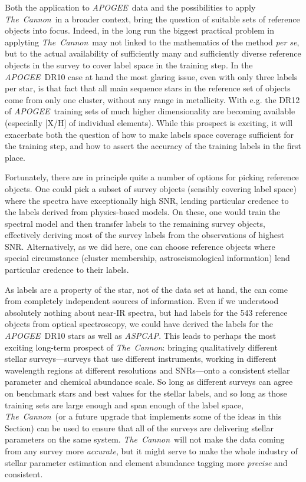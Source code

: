 \documentclass[12pt, preprint]{aastex}
\newcommand{\sectionname}{Section}
\newcommand{\tc}{\textsl{The~Cannon}}
\newcommand{\apogee}{\textsl{APOGEE}}
\newcommand{\aspcap}{\textsl{ASPCAP}}
\begin{document}
Both the application to \apogee\ data and the possibilities to apply \tc\ in a broader context, bring the question of suitable sets of reference objects into focus. Indeed, in the long run the biggest practical problem in applyting \tc\ may not linked to the mathematics of the method \textit{per se}, but to the actual availability of sufficiently many and sufficiently diverse reference objects in the survey to cover label space in the training step. In the \apogee\ DR10 case at hand the most glaring issue, even with only three labels per star, is 
that fact that all main sequence stars in the reference set of objects come from only one cluster, without any range in metallicity. With e.g. the DR12 of \apogee\ training sets of much higher dimensionality are becoming available (especially [X/H] of individual elements). While this prospect is exciting, it will exacerbate both the question of how to make labels space coverage sufficient for the training step, and how to assert the accuracy of the training labels in the first place. 

Fortunately, there are in principle quite a number of options for picking reference objects. One could pick a subset of survey objects (sensibly covering label space) where the spectra have exceptionally high SNR, 
lending particular credence to the labels derived from physics-based models. On these, one would train the spectral model and then transfer labels to the remaining survey objects, effectively deriving most of the survey labels from the observations of highest SNR.
Alternatively, as we did here, one can choose reference objects where special circumstance (cluster membership, astroseismological information) lend particular credence to their labels. 

As labels are a property of the star, not of the data set at hand, the can come from completely independent sources of information. Even if we understood absolutely nothing about near-IR spectra, but had labels for the 543 reference objects from optical spectroscopy, we could have derived the labels for the \apogee\ DR10 stars as well as \aspcap. This leads to perhaps the most exciting long-term prospect of \tc : bringing
qualitatively different stellar surveys---surveys that use different
instruments, working in different wavelength regions at different
resolutions and SNRs---onto a consistent stellar parameter and
chemical abundance scale.
So long as different surveys can agree on benchmark stars and best
values for the stellar labels, and so long as those training sets are
large enough and span enough of the label space, \tc\ (or a future
upgrade that implements some of the ideas in this \sectionname) can be
used to ensure that all of the surveys are delivering stellar
parameters on the same system.
\tc\ will not make the data coming from any survey more
\emph{accurate}, but it might serve to make the whole industry of
stellar parameter estimation and element abundance tagging more \emph{precise} and consistent.
\end{document}
